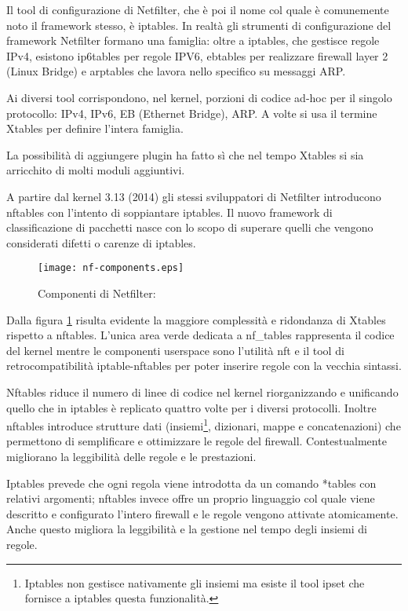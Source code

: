 Il tool di configurazione di Netfilter, che è poi il nome col quale è
comunemente noto il framework stesso, è iptables.
In realtà gli strumenti di configurazione del framework Netfilter formano una
famiglia: oltre a iptables, che gestisce regole IPv4, esistono ip6tables per
regole IPV6, ebtables per realizzare firewall layer 2 (Linux Bridge)
e arptables che lavora nello specifico su messaggi ARP.

Ai diversi tool corrispondono, nel kernel, porzioni di codice ad-hoc per il
singolo protocollo: IPv4, IPv6, EB (Ethernet Bridge), ARP.  A volte si usa
il termine Xtables per definire l'intera famiglia.

La possibilità di aggiungere plugin ha fatto s\`i che nel tempo Xtables si
sia arricchito di molti moduli aggiuntivi.

A partire dal kernel 3.13 (2014) gli stessi sviluppatori di Netfilter
introducono nftables con l'intento
di soppiantare iptables.  Il nuovo framework di classificazione di pacchetti
nasce con lo scopo di superare quelli che vengono considerati difetti o
carenze di iptables.
\begin{figure}[H]
    \texttt{[image: nf-components.eps]}
    \caption[Componenti di Netfilter]{Componenti di Netfilter:\footnotemark}
    \label{fig:netfilter}
\end{figure}
\noindent Dalla figura \ref{fig:netfilter} risulta evidente la maggiore complessità e
%
ridondanza di Xtables rispetto a nftables. L'unica area verde dedicata a
nf\_tables rappresenta il codice del kernel mentre le componenti userspace
sono l'utilità nft e il tool di retrocompatibilità iptable-nftables per poter
inserire regole con la vecchia sintassi.

Nftables riduce il numero di linee di codice nel kernel riorganizzando e
unificando quello che in iptables è replicato quattro volte per i diversi protocolli.
Inoltre nftables introduce strutture dati (insiemi\footnote{Iptables non
    gestisce nativamente gli insiemi ma esiste il tool ipset che fornisce a
iptables questa funzionalità.}, dizionari, mappe e concatenazioni) che permettono di
semplificare e ottimizzare le regole del firewall. Contestualmente migliorano la
leggibilità delle regole e le prestazioni.

Iptables prevede che ogni regola viene introdotta da un comando *tables con
relativi argomenti; nftables invece offre un proprio linguaggio col quale
viene descritto e configurato l'intero firewall e le regole vengono attivate
atomicamente. Anche questo migliora la leggibilit\`a e la gestione nel tempo
degli insiemi di regole.


